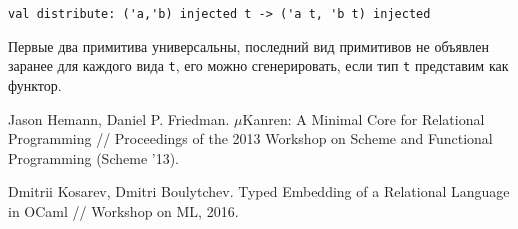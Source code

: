 \documentclass[10pt]{article}
\begin{document}
 \verb|val distribute: ('a,'b) injected t -> ('a t, 'b t) injected|

Первые два примитива универсальны, последний вид примитивов не объявлен заранее для каждого вида \verb|t|, 
его можно сгенерировать, если тип \verb|t| представим как функтор.

\begin{thebibliography}{99}

Jason Hemann, Daniel P. Friedman. $\mu$Kanren: A Minimal Core for Relational Programming //
Proceedings of the 2013 Workshop on Scheme and Functional Programming (Scheme '13).

Dmitrii Kosarev, Dmitri Boulytchev. Typed Embedding of a Relational Language in OCaml //
Workshop on ML, 2016.
 
\end{thebibliography}
\end{document}
